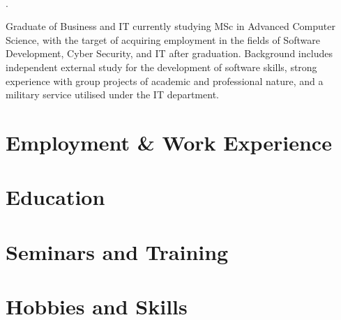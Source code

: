 \documentclass{template}
\begin{document}
\thispagestyle{empty}
\pagestyle{fancy}

\centering

\\
.
\\
\justify

Graduate of Business and IT currently studying MSc in Advanced Computer Science, with the target of acquiring employment in the fields of Software Development, Cyber Security, and IT after graduation. Background includes independent external study for the development of software skills, strong experience with group projects of academic and professional nature, and a military service utilised under the IT department.


\section{Employment \& Work Experience}


\section{Education}


\section{Seminars and Training}


\section{Hobbies and Skills}

\end{document}
